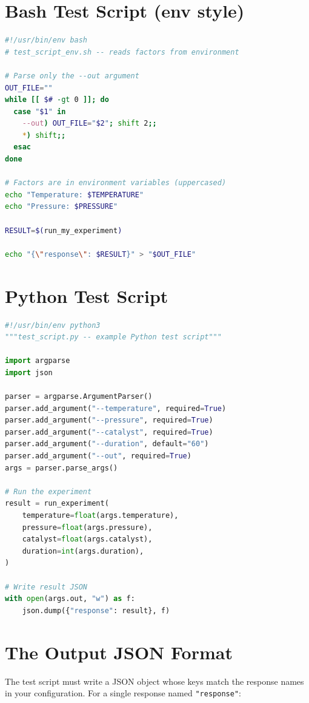 \documentclass[11pt]{book}
\begin{document}
\section{Bash Test Script (env style)}

\begin{lstlisting}[language=bash]
#!/usr/bin/env bash
# test_script_env.sh -- reads factors from environment

# Parse only the --out argument
OUT_FILE=""
while [[ $# -gt 0 ]]; do
  case "$1" in
    --out) OUT_FILE="$2"; shift 2;;
    *) shift;;
  esac
done

# Factors are in environment variables (uppercased)
echo "Temperature: $TEMPERATURE"
echo "Pressure: $PRESSURE"

RESULT=$(run_my_experiment)

echo "{\"response\": $RESULT}" > "$OUT_FILE"
\end{lstlisting}

\section{Python Test Script}

\begin{lstlisting}[language=python]
#!/usr/bin/env python3
"""test_script.py -- example Python test script"""

import argparse
import json

parser = argparse.ArgumentParser()
parser.add_argument("--temperature", required=True)
parser.add_argument("--pressure", required=True)
parser.add_argument("--catalyst", required=True)
parser.add_argument("--duration", default="60")
parser.add_argument("--out", required=True)
args = parser.parse_args()

# Run the experiment
result = run_experiment(
    temperature=float(args.temperature),
    pressure=float(args.pressure),
    catalyst=float(args.catalyst),
    duration=int(args.duration),
)

# Write result JSON
with open(args.out, "w") as f:
    json.dump({"response": result}, f)
\end{lstlisting}

\section{The Output JSON Format}

The test script must write a JSON object whose keys match the response names in your configuration. For a single response named \texttt{"response"}:
\end{document}
